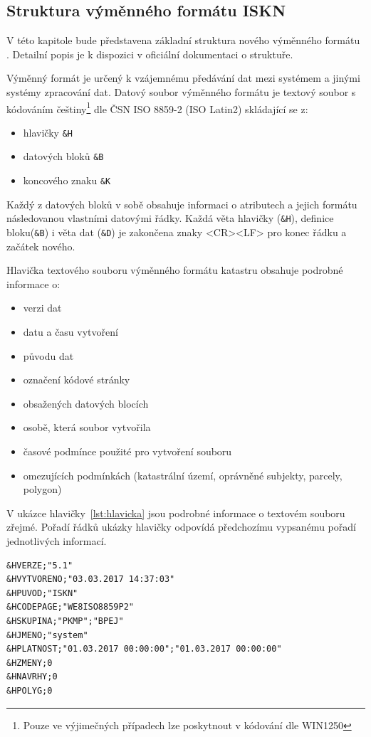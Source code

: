 \subsection{Struktura výměnného formátu ISKN}
V této kapitole bude představena základní struktura nového výměnného formátu . Detailní popis je k dispozici v oficiální dokumentaci o struktuře\cite{struktura_ISKN}.

Výměnný formát je určený k vzájemnému předávání dat mezi systémem  a jinými systémy zpracování dat. Datový soubor výměnného formátu je textový soubor s kódováním češtiny\footnote{Pouze ve výjimečných případech lze poskytnout v kódování dle WIN1250} dle ČSN ISO 8859-2 (ISO Latin2) skládající se z:
\begin{itemize}[leftmargin=50pt]
		\item hlavičky \verb|&H|
		\item datových bloků \verb|&B|
		\item koncového znaku \verb|&K|
\end{itemize}
Každý z datových bloků v sobě obsahuje informaci o atributech a jejich formátu následovanou vlastními datovými řádky. Každá věta hlavičky (\verb|&H|), definice bloku(\verb|&B|) i věta dat (\verb|&D|) je zakončena znaky <CR><LF> pro konec řádku a začátek nového. %

Hlavička textového souboru výměnného formátu katastru obsahuje podrobné informace o:
\begin{itemize}[leftmargin=50pt]
		\item verzi dat
		\item datu a času vytvoření
		\item původu dat
		\item označení kódové stránky
		\item obsažených datových blocích
		\item osobě, která soubor vytvořila
		\item časové podmínce použité pro vytvoření souboru
		\item omezujících podmínkách (katastrální území, oprávněné subjekty, parcely, polygon)
\end{itemize}
V ukázce hlavičky~\ref{lst:hlavicka} jsou podrobné informace o textovém souboru zřejmé. Pořadí řádků ukázky hlavičky odpovídá předchozímu vypsanému pořadí jednotlivých informací.
\begin{lstlisting}[caption=Ukázka hlavičky neúplných dat, label=lst:hlavicka]
&HVERZE;"5.1"
&HVYTVORENO;"03.03.2017 14:37:03"
&HPUVOD;"ISKN"
&HCODEPAGE;"WE8ISO8859P2"
&HSKUPINA;"PKMP";"BPEJ"
&HJMENO;"system"
&HPLATNOST;"01.03.2017 00:00:00";"01.03.2017 00:00:00"
&HZMENY;0
&HNAVRHY;0
&HPOLYG;0
\end{lstlisting}

